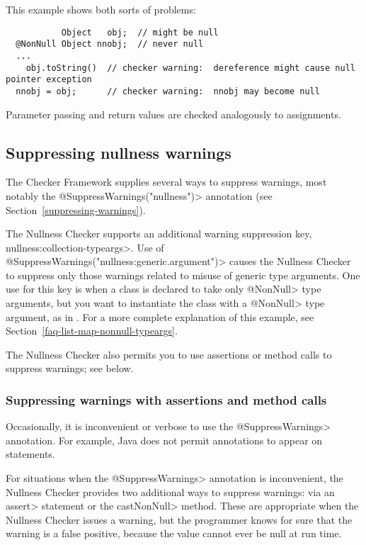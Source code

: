 This example shows both sorts of problems:

\begin{Verbatim}
           Object   obj;  // might be null
  @NonNull Object nnobj;  // never null
  ...
    obj.toString()  // checker warning:  dereference might cause null pointer exception
  nnobj = obj;      // checker warning:  nnobj may become null
\end{Verbatim}

Parameter passing and return values are checked analogously to assignments.



\subsection{Suppressing nullness warnings\label{suppressing-warnings-nullness}}

The Checker Framework supplies several ways to suppress warnings, most
notably the \<@SuppressWarnings("nullness")> annotation (see
Section~\ref{suppressing-warnings}).

The Nullness Checker supports an additional warning suppression key, 
\<nullness:collection-typeargs>.
Use of \<@SuppressWarnings("nullness:generic.argument")> causes the Nullness
Checker to suppress only those warnings related to misuse of generic type
arguments.  One use for this key is when a class is declared to take only
\<@NonNull> type arguments, but you want to instantiate the class with a
\<@NonNull> type argument, as in .  For a more
complete explanation of this example, see
Section~\ref{faq-list-map-nonnull-typeargs}.

The Nullness Checker also permits you to use assertions or method calls to
suppress warnings; see below.



\subsubsection{Suppressing warnings with assertions and method calls\label{suppressing-warnings-with-assertions}}

Occasionally, it is inconvenient or
verbose to use the \<@SuppressWarnings> annotation.  For example, Java does
not permit annotations to appear on statements.

For situations when the \<@SuppressWarnings> annotation is inconvenient,
the Nullness Checker provides two additional ways to suppress warnings:
via an \<assert> statement or the \<castNonNull> method.  These are
appropriate when the Nullness Checker issues a warning, but the programmer
knows for sure that the warning is a false positive, because the value
cannot ever be null at run time.

